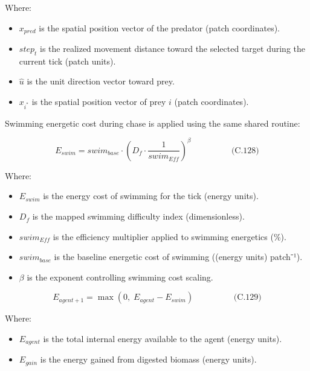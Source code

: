 \documentclass[
]{book}
\providecommand{\tightlist}{%
  \setlength{\itemsep}{0pt}\setlength{\parskip}{0pt}}
\begin{document}
Where:

\begin{itemize}
\tightlist
\item
  \(x_{pred}\) is the spatial position vector of the predator (patch
  coordinates).
\item
  \(step_{t}\) is the realized movement distance toward the selected
  target during the current tick (patch units).
\item
  \(\hat{u}\) is the unit direction vector toward prey.
\item
  \(x_{i^*}\) is the spatial position vector of prey \(i\) (patch
  coordinates).
\end{itemize}

Swimming energetic cost during chase is applied using the same shared
routine:

\[
\begin{equation} E_{swim} = swim_{base} \cdot \left(D_f \cdot \frac{1}{swim_{Eff}}\right)^{\beta}  \hspace{2cm} \text{(C.128)} \end{equation}
\]

Where:

\begin{itemize}
\tightlist
\item
  \(E_{swim}\) is the energy cost of swimming for the tick (energy
  units).
\item
  \(D_f\) is the mapped swimming difficulty index (dimensionless).
\item
  \(swim_{Eff}\) is the efficiency multiplier applied to swimming
  energetics (\%).
\item
  \(swim_{base}\) is the baseline energetic cost of swimming ((energy
  units) patch⁻¹).
\item
  \(\beta\) is the exponent controlling swimming cost scaling.
\end{itemize}

\[
\begin{equation} E_{agent+1} = \max(0,\; E_{agent} - E_{swim})  \hspace{2cm} \text{(C.129)} \end{equation}
\]

Where:

\begin{itemize}
\tightlist
\item
  \(E_{agent}\) is the total internal energy available to the agent
  (energy units).
\item
  \(E_{gain}\) is the energy gained from digested biomass (energy
  units).
\end{itemize}
\end{document}

